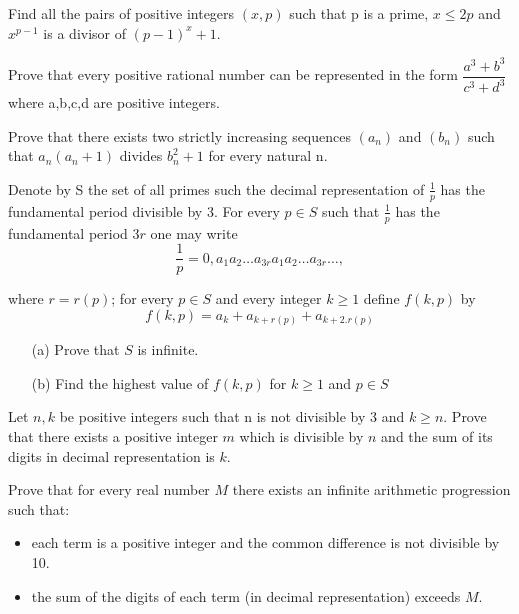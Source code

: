 \item[\textbf{N1.}]Find all the pairs of positive integers $(x,p)$ such that p is a prime, $x \leq 2p$ and $x^{p-1}$ is a divisor of $ (p-1)^{x}+1$.

\item[\textbf{N2.}]Prove that every positive rational number can be represented in the form $\dfrac{a^{3}+b^{3}}{c^{3}+d^{3}}$ where a,b,c,d are positive integers.

\item[\textbf{N3.}]Prove that there exists two strictly increasing sequences $(a_{n})$ and $(b_{n})$ such that $a_{n}(a_{n}+1)$ divides $b^{2}_{n}+1$ for every natural n.

\item[\textbf{N4.}]Denote by S the set of all primes such the decimal representation of $\frac{1}{p}$ has the fundamental period divisible by 3. For every $p \in S$ such that $\frac{1}{p}$ has the fundamental period $3r$ one may write\[\frac{1}{p}=0,a_{1}a_{2}\ldots a_{3r}a_{1}a_{2} \ldots a_{3r} \ldots , \]

where $r=r(p)$; for every $p \in S$ and every integer $k \geq 1$ define $f(k,p)$ by \[ f(k,p)= a_{k}+a_{k+r(p)}+a_{k+2.r(p)}\]

\begin{itemize}
\item[(a)] Prove that $S$ is infinite.

\item[(b)] Find the highest value of $f(k,p)$ for $k \geq 1$ and $p \in S$
\end{itemize}

\item[\textbf{N5.}]Let $n,k$ be positive integers such that n is not divisible by 3 and $k \geq n$. Prove that there exists a positive integer $m$ which is divisible by $n$ and the sum of its digits in decimal representation is $k$.

\item[\textbf{N6.}]Prove that for every real number $M$ there exists an infinite arithmetic progression such that:

\begin{itemize}
\item each term is a positive integer and the common difference is not divisible by 10.
\item the sum of the digits of each term (in decimal representation) exceeds $M$.
\end{itemize}
